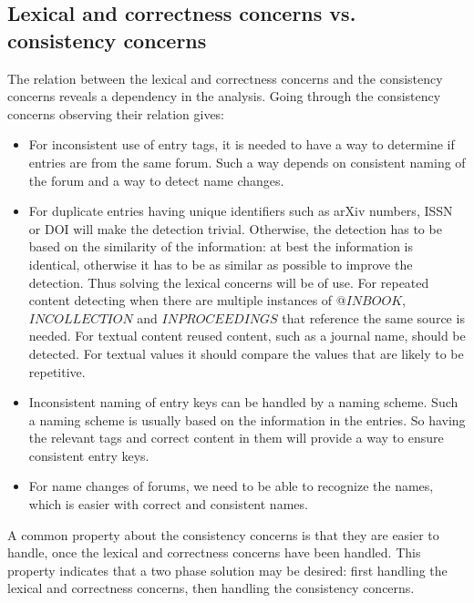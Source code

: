 \subsection{Lexical and correctness concerns vs. consistency concerns}
\label{sec:approach_lexical_consistency}

The relation between the lexical and correctness concerns and the
consistency concerns reveals a dependency in the analysis.  Going
through the consistency concerns observing their relation gives:

\begin{itemize}
\item For inconsistent use of entry tags, it is needed to have a way
  to determine if entries are from the same forum.  Such a
  way depends on consistent naming of the forum and a way to detect
  name changes.

\item For duplicate entries having unique identifiers such as arXiv
  numbers, ISSN or DOI will make the detection trivial.  Otherwise,
  the detection has to be based on the similarity of the information:
  at best the information is identical, otherwise it has to be as
  similar as possible to improve the detection.  Thus solving the
  lexical concerns will be of use.  For repeated content detecting
  when there are multiple instances of $@INBOOK$, $INCOLLECTION$ and
  $INPROCEEDINGS$ that reference the same source is needed.  For
  textual content reused content, such as a journal name, should be
  detected.  For textual values it should compare the values that are
  likely to be repetitive.

\item Inconsistent naming of entry keys can be handled by a naming
  scheme.  Such a naming scheme is usually based on the information in
  the entries.  So having the relevant tags and correct content in
  them will provide a way to ensure consistent entry keys.

\item For name changes of forums, we need to be able to recognize the
  names, which is easier with correct and consistent names.
\end{itemize}

A common property about the consistency concerns is that they are
easier to handle, once the lexical and correctness concerns have been
handled.  This property indicates that a two phase solution may be
desired: first handling the lexical and correctness concerns, then
handling the consistency concerns.


